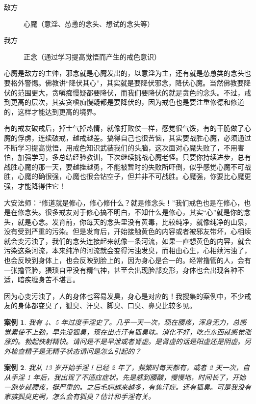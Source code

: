 \documentclass{ctexart}
\newtheorem{case}{案例}
\begin{document}
\begin{description}
    \item[敌方] 心魔（意淫、怂恿的念头、想试的念头等）
    \item[我方] 正念（通过学习提高觉悟而产生的戒色意识）
\end{description}

心魔是敌方的主帅，邪念就是心魔发出的，以意淫为主，还有就是怂恿类的念头也要格外警惕。佛教讲“降伏其心”，其实就是要降伏邪念，降伏心魔。当然佛教要降伏的范围更大，贪嗔痴慢疑都要降伏，而我们要降伏的就是贪色的念头。不过，戒到更高的层次，其实贪嗔痴慢疑都是要降伏的，因为戒色也是要注重修德和修道的，这样才能达到更高的境界。

有的戒友破戒后，掉士气掉热情，就像打败仗一样，感觉很气馁，有的干脆做了心魔的俘虏，连续破戒，越戒越差。搞得自己也很苦恼，其实要战胜心魔，必须通过不断学习提高觉悟，用戒色知识武装我们的头脑，这次面对心魔失败了，不用害怕，加强学习，多总结经验教训，下次继续挑战心魔老怪。只要你持续进步，总有战胜心魔的那一天，要越挫越勇，不能被暂时的失败所吓倒，似乎感觉心魔不可战胜，心魔的确很强，心魔也很会钻空子，但并非不可战胜。心魔强，你要比心魔更强，才能降得住它！

大安法师：“修道就是修心，修心修什么？就是修念头！”我们戒色也是在修心，也是在修念头。很多戒友对于修心搞不明白，不知什么是修心，其实“心”就是你的念头，就是心念。发育前，你每天的念头里没有黄毒，比较纯净，就像纯净的山泉，没有受到严重的污染。但是发育后，开始接触黄色的内容或者被邪友带坏，心相续就会变污浊了，我们的念头连接起来就像一条河流，如果一直想黄色的内容，就会污染这条河流，本来纯净的河流就会变得污浊发臭，而相由心生，心相续污浊了，也会反映到身体上，也会反映到脸上的，因为身心是合一的。经常撸管的人，会有一张撸管脸，猥琐自卑没有精气神，甚至会出现脸部变形，身体也会出现各种不适，暗疾缠身苦不堪言。

因为心变污浊了，人的身体也容易发臭，身心是对应的！我搜集的案例中，不少戒友的身体都变臭了，狐臭、汗臭、脚臭、口臭、鼻臭比较多见。

\begin{case}
    我有 4、5 年过度手淫史了。几乎一天一次，现在腰疼，浑身无力，总感觉累使不上劲，早先没狐臭，现在出点汗有狐臭味。消化不好，吃点东西就感觉涨涨的。勃起快射精快。请问是不是早泄或者肾虚。是肾虚的话是阳虚还是阴虚。另外检查精子是无精子状态请问是怎么引起的？
\end{case}

\begin{case}
    我从 13 岁开始手淫！已经 2 年了，频繁时每天都有，或者 2 天一次，自从手淫 1 年后，我出现了不适应症状。先是感到腰酸，慢慢地，时间长了，开始一跑步就腰疼，挺严重的。之后毛病越来越多，有焦汗症。还有狐臭。可是我没有家族狐臭史啊，怎么会有狐臭？估计和手淫有关。
\end{case}
\end{document}
